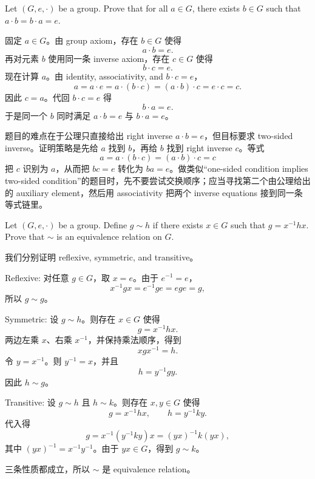 \begin{exerciseblock}
Let \((G,e,\cdot)\) be a group. Prove that for all \(a\in G\), there exists \(b\in G\) such that \(a\cdot b=b\cdot a=e\).
\end{exerciseblock}

\begin{solution}
固定 \(a\in G\)。由 group axiom，存在 \(b\in G\) 使得
\[
  a\cdot b=e.
\]
再对元素 \(b\) 使用同一条 inverse axiom，存在 \(c\in G\) 使得
\[
  b\cdot c=e.
\]
现在计算 \(a\)。由 identity, associativity, and \(b\cdot c=e\)，
\[
  a=a\cdot e=a\cdot(b\cdot c)=(a\cdot b)\cdot c=e\cdot c=c.
\]
因此 \(c=a\)。代回 \(b\cdot c=e\) 得
\[
  b\cdot a=e.
\]
于是同一个 \(b\) 同时满足 \(a\cdot b=e\) 与 \(b\cdot a=e\)。
\end{solution}

\begin{explanation}
题目的难点在于公理只直接给出 right inverse \(a\cdot b=e\)，但目标要求 two-sided inverse。证明策略是先给 \(a\) 找到 \(b\)，再给 \(b\) 找到 right inverse \(c\)。等式
\[
  a=a\cdot(b\cdot c)=(a\cdot b)\cdot c=c
\]
把 \(c\) 识别为 \(a\)，从而把 \(bc=e\) 转化为 \(ba=e\)。做类似“one-sided condition implies two-sided condition”的题目时，先不要尝试交换顺序；应当寻找第二个由公理给出的 auxiliary element，然后用 associativity 把两个 inverse equations 接到同一条等式链里。
\end{explanation}

\begin{exerciseblock}
Let \((G,e,\cdot)\) be a group. Define \(g\sim h\) if there exists \(x\in G\) such that \(g=x^{-1}hx\). Prove that \(\sim\) is an equivalence relation on \(G\).
\end{exerciseblock}

\begin{solution}
我们分别证明 reflexive, symmetric, and transitive。

Reflexive: 对任意 \(g\in G\)，取 \(x=e\)。由于 \(e^{-1}=e\)，
\[
  x^{-1}gx=e^{-1}ge=ege=g,
\]
所以 \(g\sim g\)。

Symmetric: 设 \(g\sim h\)。则存在 \(x\in G\) 使得
\[
  g=x^{-1}hx.
\]
两边左乘 \(x\)、右乘 \(x^{-1}\)，并保持乘法顺序，得到
\[
  xgx^{-1}=h.
\]
令 \(y=x^{-1}\)。则 \(y^{-1}=x\)，并且
\[
  h=y^{-1}gy.
\]
因此 \(h\sim g\)。

Transitive: 设 \(g\sim h\) 且 \(h\sim k\)。则存在 \(x,y\in G\) 使得
\[
  g=x^{-1}hx,\qquad h=y^{-1}ky.
\]
代入得
\[
  g=x^{-1}(y^{-1}ky)x=(yx)^{-1}k(yx),
\]
其中 \((yx)^{-1}=x^{-1}y^{-1}\)。由于 \(yx\in G\)，得到 \(g\sim k\)。

三条性质都成立，所以 \(\sim\) 是 equivalence relation。
\end{solution}

